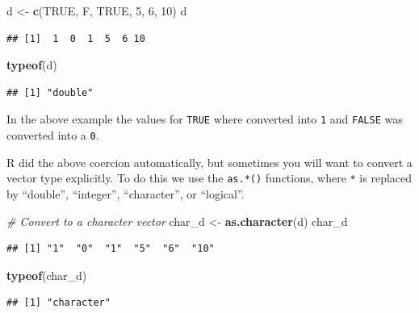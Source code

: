 \documentclass[
]{book}
\newenvironment{Shaded}{\begin{snugshade}}{\end{snugshade}}
\newcommand{\CommentTok}[1]{\textcolor[rgb]{0.56,0.35,0.01}{\textit{#1}}}
\newcommand{\DecValTok}[1]{\textcolor[rgb]{0.00,0.00,0.81}{#1}}
\newcommand{\KeywordTok}[1]{\textcolor[rgb]{0.13,0.29,0.53}{\textbf{#1}}}
\newcommand{\NormalTok}[1]{#1}
\newcommand{\OtherTok}[1]{\textcolor[rgb]{0.56,0.35,0.01}{#1}}
\newcommand{\StringTok}[1]{\textcolor[rgb]{0.31,0.60,0.02}{#1}}
\begin{document}
\begin{Shaded}
\begin{Highlighting}[]
\NormalTok{d <-}\StringTok{ }\KeywordTok{c}\NormalTok{(}\OtherTok{TRUE}\NormalTok{, F, }\OtherTok{TRUE}\NormalTok{, }\DecValTok{5}\NormalTok{, }\DecValTok{6}\NormalTok{, }\DecValTok{10}\NormalTok{)}
\NormalTok{d}
\end{Highlighting}
\end{Shaded}

\begin{verbatim}
## [1]  1  0  1  5  6 10
\end{verbatim}

\begin{Shaded}
\begin{Highlighting}[]
\KeywordTok{typeof}\NormalTok{(d)}
\end{Highlighting}
\end{Shaded}

\begin{verbatim}
## [1] "double"
\end{verbatim}

In the above example the values for \texttt{TRUE} where converted into \texttt{1} and \texttt{FALSE} was converted into a \texttt{0}.

R did the above coercion automatically, but sometimes you will want to convert a vector type explicitly. To do this we use the \texttt{as.*()} functions, where \texttt{*} is replaced by ``double'', ``integer'', ``character'', or ``logical''.

\begin{Shaded}
\begin{Highlighting}[]
\CommentTok{# Convert to a character vector}
\NormalTok{char_d <-}\StringTok{ }\KeywordTok{as.character}\NormalTok{(d)}
\NormalTok{char_d}
\end{Highlighting}
\end{Shaded}

\begin{verbatim}
## [1] "1"  "0"  "1"  "5"  "6"  "10"
\end{verbatim}

\begin{Shaded}
\begin{Highlighting}[]
\KeywordTok{typeof}\NormalTok{(char_d)}
\end{Highlighting}
\end{Shaded}

\begin{verbatim}
## [1] "character"
\end{verbatim}
\end{document}
